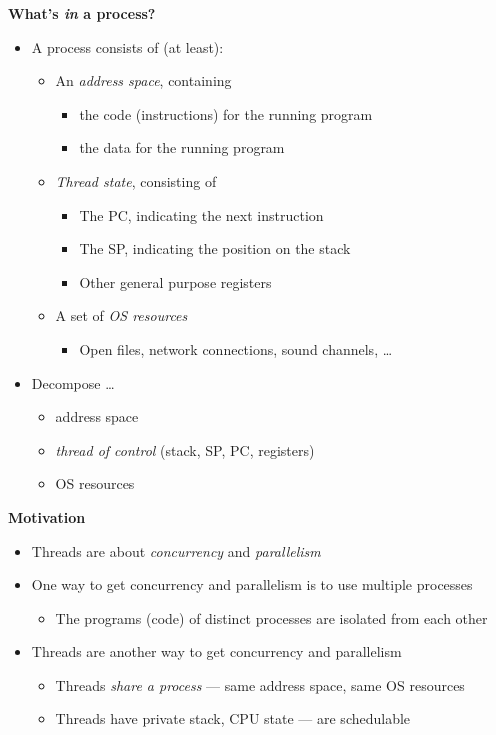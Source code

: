 \documentclass[11pt,a4paper]{article}
\begin{document}
\textbf{What's \emph{in} a process?}
\begin{itemize}
    \item A process consists of (at least):
        \begin{itemize}
            \item An \emph{address space}, containing
                \begin{itemize}
                    \item the code (instructions) for the running program
                    \item the data for the running program
                \end{itemize}
            \item \emph{Thread state}, consisting of
                \begin{itemize}
                    \item The PC, indicating the next instruction
                    \item The SP, indicating the position on the stack
                    \item Other general purpose registers
                \end{itemize}
            \item A set of \emph{OS resources}
                \begin{itemize}
                    \item Open files, network connections, sound channels, \dots
                \end{itemize}
        \end{itemize}
    \item Decompose \dots
        \begin{itemize}
            \item address space
            \item \emph{thread of control} (stack, SP, PC, registers)
            \item OS resources
        \end{itemize}
\end{itemize}

\textbf{Motivation}
\begin{itemize}
    \item Threads are about \emph{concurrency} and \emph{parallelism}
    \item One way to get concurrency and parallelism is to use multiple processes
        \begin{itemize}
            \item The programs (code) of distinct processes are isolated from each other
        \end{itemize}
    \item Threads are another way to get concurrency and parallelism
        \begin{itemize}
            \item Threads \emph{share a process} --- same address space, same OS resources
            \item Threads have private stack, CPU state --- are schedulable
        \end{itemize}
\end{itemize}
\end{document}
